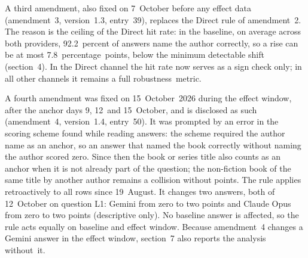 \documentclass[11pt]{article}
\begin{document}
A third amendment, also fixed on 7~October before any effect data (amendment~3, version~1.3, entry~39), replaces the Direct rule of amendment~2. The reason is the ceiling of the Direct hit rate: in the baseline, on average across both providers, 92.2~percent of answers name the author correctly, so a rise can be at most 7.8~percentage~points, below the minimum detectable shift (section~4). In the Direct channel the hit rate now serves as a sign check only; in all other channels it remains a full robustness~\mbox{metric.}

A fourth amendment was fixed on 15~October~2026 during the effect window, after the anchor days 9, 12~and 15~October, and is disclosed as such (amendment~4, version~1.4, entry~50). It was prompted by an error in the scoring scheme found while reading answers: the scheme required the author name as an anchor, so an answer that named the book correctly without naming the author scored zero. Since then the book or series title also counts as an anchor when it is not already part of the question; the non-fiction book of the same title by another author remains a collision without points. The rule applies retroactively to all rows since 19~August. It changes two answers, both of 12~October on question L1: Gemini from zero to two points and Claude Opus from zero to two points (descriptive only). No baseline answer is affected, so the rule acts equally on baseline and effect window. Because amendment~4 changes a Gemini answer in the effect window, section~7 also reports the analysis without~\mbox{it.}
\end{document}
